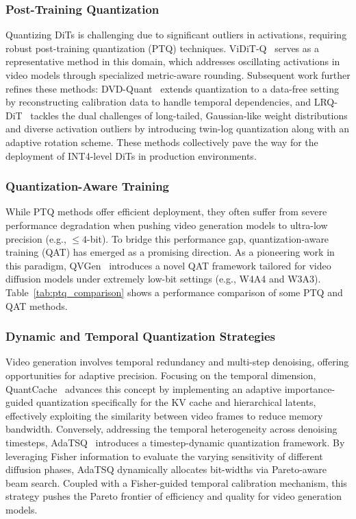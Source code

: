 \documentclass[lettersize,journal]{IEEEtran}
\begin{document}
\subsubsection{Post-Training Quantization}
Quantizing DiTs is challenging due to significant outliers in activations, requiring robust post-training quantization (PTQ) techniques.
{ViDiT-Q}~\cite{zhao2025viditq} serves as a representative method in this domain, which addresses oscillating activations in video models through specialized metric-aware rounding.
Subsequent work further refines these methods: {DVD-Quant}~\cite{li2025dvd} extends quantization to a data-free setting by reconstructing calibration data to handle temporal dependencies, and {LRQ-DiT}~\cite{yang2025lrq} tackles the dual challenges of long-tailed, Gaussian-like weight distributions and diverse activation outliers by introducing twin-log quantization along with an adaptive rotation scheme. 
These methods collectively pave the way for the deployment of INT4-level DiTs in production environments.

\subsubsection{Quantization-Aware Training}
While PTQ methods offer efficient deployment, they often suffer from severe performance degradation when pushing video generation models to ultra-low precision (e.g., $\le 4$-bit). To bridge this performance gap, quantization-aware training (QAT) has emerged as a promising direction.
As a pioneering work in this paradigm, {QVGen}~\cite{huang2026qvgen} introduces a novel QAT framework tailored for video diffusion models under extremely low-bit settings (e.g., W4A4 and W3A3). Table~\ref{tab:ptq_comparison} shows a performance comparison of some PTQ and QAT methods.

\subsubsection{Dynamic and Temporal Quantization Strategies}
Video generation involves temporal redundancy and multi-step denoising, offering opportunities for adaptive precision.
Focusing on the temporal dimension, {QuantCache}~\cite{Wu_2025_ICCV} advances this concept by implementing an adaptive importance-guided quantization specifically for the KV cache and hierarchical latents, effectively exploiting the similarity between video frames to reduce memory bandwidth.
Conversely, addressing the temporal heterogeneity across denoising timesteps, {AdaTSQ}~\cite{zhang2026adatsq} introduces a timestep-dynamic quantization framework. By leveraging Fisher information to evaluate the varying sensitivity of different diffusion phases, AdaTSQ dynamically allocates bit-widths via Pareto-aware beam search. Coupled with a Fisher-guided temporal calibration mechanism, this strategy pushes the Pareto frontier of efficiency and quality for video generation models.
\end{document}

